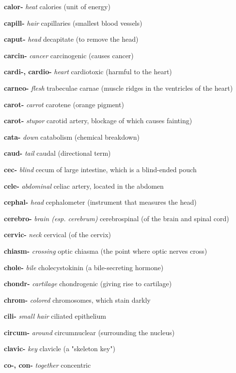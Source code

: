 \documentclass[10pt]{article}
\begin{document}
\begin{multicols}{2}
\begin{hangparas}{10pt}{1}
 \textbf{calor-} \textit{heat } calories (unit of energy) \par
 \textbf{capill-} \textit{hair } capillaries (smallest blood vessels) \par
 \textbf{caput-} \textit{head } decapitate (to remove the head)\par
 \textbf{carcin-} \textit{cancer} carcinogenic (causes cancer) \par
 \textbf{cardi-, cardio-} \textit{heart} cardiotoxic (harmful to the heart) \par
 \textbf{carneo-} \textit{flesh } trabeculae carnae (muscle ridges in the ventricles of the heart) \par
 \textbf{carot-} \textit{carrot} carotene (orange pigment) \par
 \textbf{carot-} \textit{stupor} carotid artery, blockage of which causes fainting) \par
 \textbf{cata-} \textit{down } catabolism (chemical breakdown) \par
 \textbf{caud-} \textit{tail } caudal (directional term) \par
 \textbf{cec-} \textit{blind } cecum of large intestine, which is a blind-ended pouch \par
 \textbf{cele-} \textit{abdominal} celiac artery, located in the abdomen \par
 \textbf{cephal-} \textit{head } cephalometer (instrument that measures the head) \par
 \textbf{cerebro-} \textit{brain (esp. cerebrum)} cerebrospinal (of the brain and spinal cord) \par
 \textbf{cervic-} \textit{neck } cervical (of the cervix) \par
 \textbf{chiasm- } \textit{crossing} optic chiasma (the point where optic nerves cross) \par
 \textbf{chole- } \textit{bile } cholecystokinin (a bile-secreting hormone) \par
 \textbf{chondr- } \textit{cartilage} chondrogenic (giving rise to cartilage) \par
 \textbf{chrom- } \textit{colored} chromosomes, which stain darkly \par
 \textbf{cili- } \textit{small hair} ciliated epithelium \par
 \textbf{circum- } \textit{around} circumnuclear (surrounding the nucleus) \par
 \textbf{clavic- } \textit{key } clavicle (a "skeleton key") \par
 \textbf{co-, con- } \textit{together} concentric \par

\end{hangparas}
\end{multicols}
\end{document}
